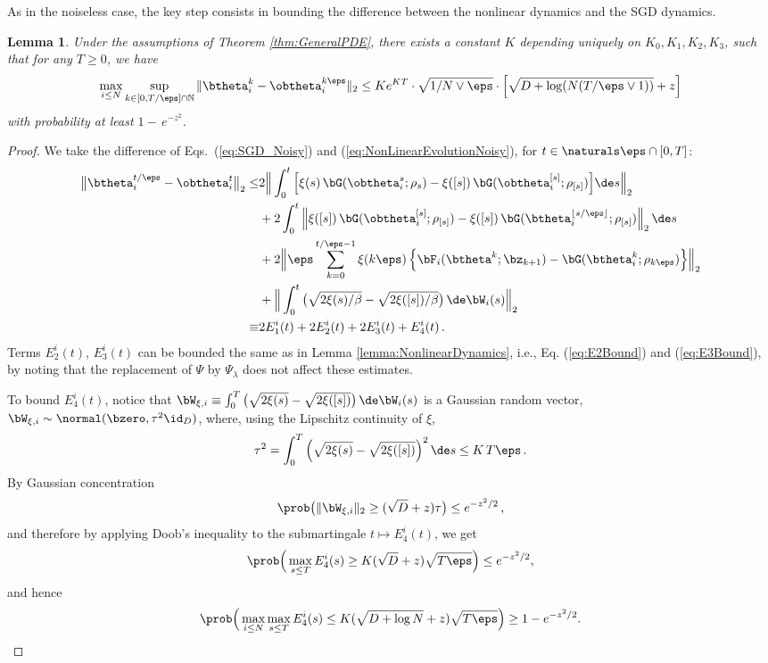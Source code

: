 \documentclass[11pt]{article}
\newtheorem{lemma}{Lemma}
\begin{document}
As in the noiseless case, the key step consists in bounding the difference between the nonlinear dynamics and the SGD dynamics.
% 
\begin{lemma}\label{lemma:NonlinearDynamicsNoisy}
Under the assumptions of Theorem \ref{thm:GeneralPDE}, there exists a constant $K$ depending uniquely on $K_0, K_1, K_2, K_3$, such that for any $T\ge 0$, we have
%
\begin{align}
%
\max_{i \le N}\sup_{k \in [0, T/\eps] \cap \mathbb N}\|\btheta^{k}_i-\obtheta^{k\eps}_i\|_2
\le K e^{KT} \cdot \sqrt{1/N \vee \eps } \cdot \Big[\sqrt{D + \log (N (T/ \eps \vee 1))} + z \Big]
%
\end{align}
%
with probability at least $1- \, e^{-z^2}$.
\end{lemma}
%
\begin{proof}
We take the difference of Eqs.~(\ref{eq:SGD_Noisy}) and (\ref{eq:NonLinearEvolutionNoisy}), for $t\in \naturals\eps\cap [0,T]$:
%
\begin{equation}\label{eq:ErrorsDynamicsNoisy}
\begin{aligned}
%
\big\|\btheta^{t/\eps}_i-\obtheta^t_i \big\|_2 \le &2\Big\|\int_{0}^t\Big[\xi(s)\, \bG(\obtheta_i^s;\rho_s)-\xi([s])\, \bG(\obtheta_i^{[s]};\rho_{[s]})\Big]\de s\Big\|_2\\
 &+
 2\int_{0}^t\Big\|\xi([s])\, \bG(\obtheta_i^{[s]};\rho_{[s]}) -\xi([s])\, \bG(\btheta_i^{\lfloor s/\eps\rfloor};\rho_{[s]})\Big\|_2\, \de s\\
&+ 2\Big\|\eps \sum_{k=0}^{t/\eps-1}\xi(k\eps)\, \Big\{\bF_i(\btheta^{k};\bz_{k+1}) -\bG(\btheta_i^{k};\rho_{k\eps})\Big\}\Big\|_2 \\
&+\Big\|\int_0^t \big(\sqrt{2\xi(s) /\beta}-\sqrt{2\xi([s]) / \beta}\big)\, \de \bW_i(s)\Big\|_2\\
 \equiv & 2 E_1^i(t)+2 E_2^i(t)+2E_3^i(t) + E_4^i(t)\, . 
%
\end{aligned}
\end{equation}
%
Terms $E_2^i(t)$, $E_3^i(t)$ can be bounded the same as in Lemma \ref{lemma:NonlinearDynamics}, i.e., Eq. (\ref{eq:E2Bound}) and (\ref{eq:E3Bound}), by noting that the replacement of $\Psi$ by $\Psi_\lambda$ does not affect these estimates. 

To bound $E_4^i(t)$, notice that $\bW_{\xi, i} \equiv \int_0^T \big(\sqrt{2\xi(s)}-\sqrt{2\xi([s])}\big)\, \de \bW_i(s)$ is a Gaussian random vector, $\bW_{\xi, i}\sim \normal(\bzero,\tau^2\id_D)$, 
where, using the Lipschitz continuity of $\xi$, 
\[
\tau^2 = \int_0^T \Big(\sqrt{2\xi(s)}-\sqrt{2\xi([s])}\Big)^2 \, \de s\le  K\, T \eps\, .
\]
By Gaussian concentration
\[
\prob\big(\|\bW_{\xi, i}\|_2\ge (\sqrt{D}+z)\tau\big) \le e^{-z^2/2}\,, 
\]
and therefore by applying Doob's inequality to the submartingale $t\mapsto E_4^i(t)$, we get
\[
\prob\Big(\max_{s\le T} E_4^i(s) \ge K(\sqrt{D}+z) \sqrt{T\eps} \Big)\le e^{-z^2/2},
\]
and hence
\begin{align}\label{eq:E4Bound}
\prob\Big(\max_{i \le N} \max_{s\le T} E_4^i(s) \le K(\sqrt{D + \log N} + z) \sqrt{T \eps}\Big)\ge 1 - e^{-z^2/2}. 
\end{align}



\end{proof}
\end{document}
